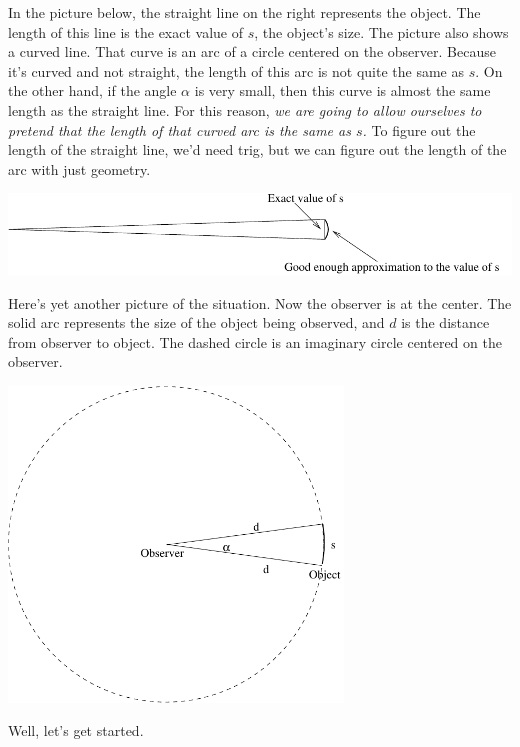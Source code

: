 In the picture below, the straight line on the right
represents the
object.  The length of this line is the exact value of $s$, the object's
size.  The picture also shows a curved line.  That curve is an arc
of a circle centered on the observer.  Because it's curved and not straight,
the length of this arc is not quite the same as $s$.  On the other hand,
if the angle $\alpha$ is very small, then this curve is almost the same
length as the straight line.  For this reason, {\it we are going to allow
ourselves to pretend that the length of that curved arc is the
same as $s$.}  To figure out the length of the straight line, we'd
need trig, but we can figure out the length of the arc with just
geometry.


\bigskip
\centerline{\includegraphics[width=6in]{angularsize/angularsizefig2.pdf}}
\bigskip

\pagebreak[3]

Here's yet another picture of the situation.  Now the observer is at
the center.  The solid arc represents the size of the object being observed,
and $d$ is the distance from observer to object.  The dashed circle
is an imaginary circle centered on the observer.

\medskip
\centerline{\includegraphics[width=3.5in]{angularsize/angularsizefig3.pdf}}
\medskip

Well, let's get started.



